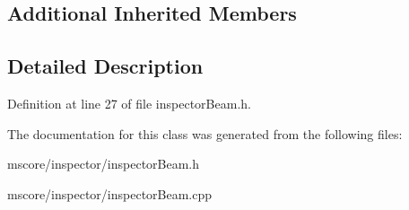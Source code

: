 \subsection*{Additional Inherited Members}


\subsection{Detailed Description}


Definition at line 27 of file inspector\+Beam.\+h.



The documentation for this class was generated from the following files\+:\begin{DoxyCompactItemize}
\item 
mscore/inspector/inspector\+Beam.\+h\item 
mscore/inspector/inspector\+Beam.\+cpp\end{DoxyCompactItemize}
